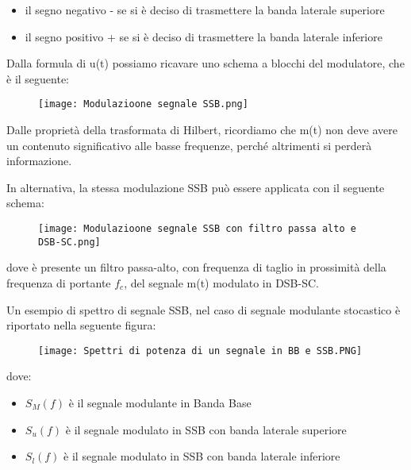 \begin{itemize}
    \item il segno negativo - se si è deciso di trasmettere la banda laterale superiore 
    \item il segno positivo + se si è deciso di trasmettere la banda laterale inferiore 
\end{itemize}

\newpage

Dalla formula di u(t) possiamo ricavare uno schema a blocchi del modulatore, che è il seguente: 

\begin{figure}[h]
    \centering
    \texttt{[image: Modulazioone segnale SSB.png]}
\end{figure}

Dalle proprietà della trasformata di Hilbert, ricordiamo che m(t) 
non deve avere un contenuto significativo alle basse frequenze, perché altrimenti si perderà informazione. \newline 

In alternativa, la stessa modulazione SSB può essere applicata con il seguente schema: 

\begin{figure}[h]
    \centering
    \texttt{[image: Modulazioone segnale SSB con filtro passa alto e DSB-SC.png]}
\end{figure}

dove è presente un filtro passa-alto, con frequenza di taglio in prossimità della frequenza di portante $f_c$, 
del segnale m(t) modulato in DSB-SC.\newline 

\newpage 

Un esempio di spettro di segnale SSB, nel caso di segnale modulante stocastico è riportato nella seguente figura: 

\begin{figure}[h]
    \centering
    \texttt{[image: Spettri di potenza di un segnale in BB e SSB.PNG]}
\end{figure}

dove: 

\begin{itemize}
    \item $S_M (f)$ è il segnale modulante in Banda Base 
    \item $S_u (f)$ è il segnale modulato in SSB con banda laterale superiore 
    \item $S_l (f)$ è il segnale modulato in SSB con banda laterale inferiore
\end{itemize}

